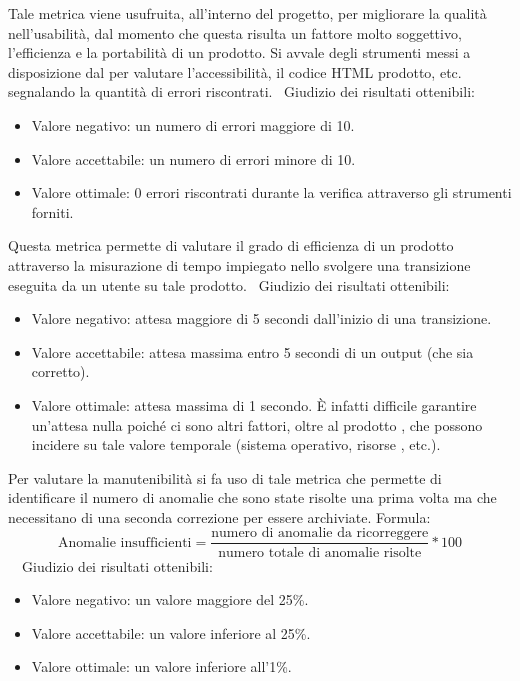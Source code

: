 \documentclass[a4paper, titlepage]{article}
\begin{document}
\label{par:web}
Tale metrica viene usufruita, all'interno del progetto, per migliorare la qualità nell'usabilità, dal momento che questa risulta un fattore molto soggettivo, l'efficienza e la portabilità di un prodotto.
Si avvale degli strumenti messi a disposizione dal  per valutare l'accessibilità, il codice HTML prodotto, etc. segnalando la quantità di errori riscontrati.
\
\newline Giudizio dei risultati ottenibili:
\begin{itemize}
\item Valore negativo: un numero di errori maggiore di 10.
\item Valore accettabile: un numero di errori minore di 10.
\item Valore ottimale: 0 errori riscontrati durante la verifica attraverso gli strumenti forniti.
\end{itemize}

\label{par:greff}
Questa metrica permette di valutare il grado di efficienza di un prodotto attraverso la misurazione di tempo impiegato nello svolgere una transizione eseguita da un utente su tale prodotto.
\
\newline Giudizio dei risultati ottenibili:
\begin{itemize}
\item Valore negativo: attesa maggiore di 5 secondi dall'inizio di una transizione.
\item Valore accettabile: attesa massima entro 5 secondi di un output (che sia corretto).
\item Valore ottimale: attesa massima di 1 secondo. È infatti difficile garantire un'attesa nulla poiché ci sono altri fattori, oltre al prodotto , che possono incidere su tale valore temporale (sistema operativo, risorse , etc.). 
\end{itemize}

\label{par:anins}
Per valutare la manutenibilità si fa uso di tale metrica che permette di identificare il numero di anomalie che sono state risolte una prima volta ma che necessitano di una seconda correzione per essere archiviate.
\newline Formula:
\begin{displaymath}
\mbox{Anomalie insufficienti}=\frac{\mbox{numero di anomalie da ricorreggere}}{\mbox{numero totale di anomalie risolte}}*100
\end{displaymath}
\
\
\newline Giudizio dei risultati ottenibili:
\begin{itemize}
\item Valore negativo: un valore maggiore del 25\%.
\item Valore accettabile: un valore inferiore al 25\%.
\item Valore ottimale: un valore inferiore all'1\%.
\end{itemize}
\end{document}
